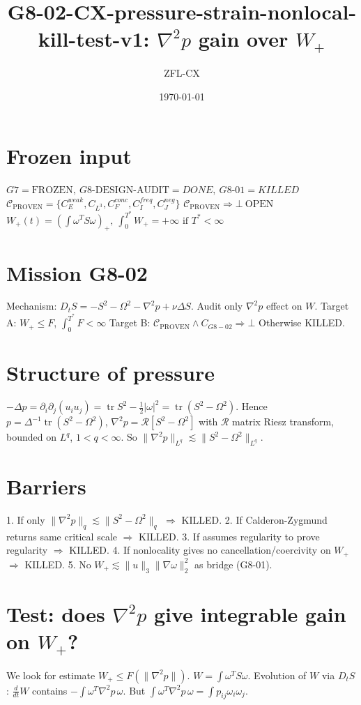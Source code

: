 \documentclass[11pt]{article}
\begin{document}
\title{G8-02-CX-pressure-strain-nonlocal-kill-test-v1: $\nabla^2p$ gain over $W_+$}
\author{ZFL-CX}\date{\today}\maketitle

\section{Frozen input}
$\boxed{G7=\mathrm{FROZEN},\ G8\text{-DESIGN-AUDIT}=DONE,\ G8\text{-}01=KILLED}$
$\boxed{\mathcal C_{\mathrm{PROVEN}}=\{C_E^{weak},C_{L^3},C_F^{conc},C_I^{freq},C_J^{neg}\}}$
$\boxed{\mathcal C_{\mathrm{PROVEN}}\Rightarrow\bot\ \mathrm{OPEN}}$
$\boxed{W_+(t)=\left(\int\omega^TS\omega\right)_+,\ \int_0^{T^*}W_+=+\infty\text{ if }T^*<\infty}$

\section{Mission G8-02}
Mechanism: $D_tS=-S^2-\Omega^2-\nabla^2p+\nu\Delta S$.
Audit only $\boxed{\nabla^2p}$ effect on $W$.
Target A: $W_+\le F$, $\int_0^{T^*}F<\infty$
Target B: $\mathcal C_{\mathrm{PROVEN}}\land C_{G8-02}\Rightarrow\bot$
Otherwise KILLED.

\section{Structure of pressure}
$-\Delta p=\partial_i\partial_j(u_iu_j)=\operatorname{tr}S^2-\tfrac12|\omega|^2=\operatorname{tr}(S^2-\Omega^2)$.
Hence $p=\Delta^{-1}\operatorname{tr}(S^2-\Omega^2)$, $\nabla^2p=\mathcal R[S^2-\Omega^2]$ with $\mathcal R$ matrix Riesz transform, bounded on $L^q$, $1<q<\infty$.
So $\boxed{\|\nabla^2p\|_{L^q}\lesssim\|S^2-\Omega^2\|_{L^q}}$.

\section{Barriers}
1. If only $\|\nabla^2p\|_q\lesssim\|S^2-\Omega^2\|_q$ $\Rightarrow$ KILLED.
2. If Calderon-Zygmund returns same critical scale $\Rightarrow$ KILLED.
3. If assumes regularity to prove regularity $\Rightarrow$ KILLED.
4. If nonlocality gives no cancellation/coercivity on $W_+$ $\Rightarrow$ KILLED.
5. No $W_+\lesssim\|u\|_3\|\nabla\omega\|_2^2$ as bridge (G8-01).

\section{Test: does $\nabla^2p$ give integrable gain on $W_+$?}
We look for estimate $W_+\le F(\|\nabla^2p\|)$.
$W=\int\omega^TS\omega$. Evolution of $W$ via $D_tS$:
$\frac{d}{dt}W$ contains $-\int\omega^T\nabla^2p\,\omega$.
But $\int\omega^T\nabla^2p\,\omega=\int p_{ij}\omega_i\omega_j$.
\end{document}
